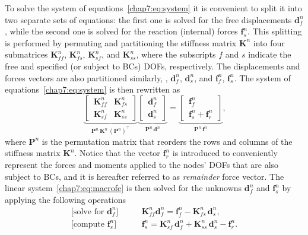 To solve the system of equations~\eqref{chap7:eq:system} it is convenient to split it into two separate sets of equations: the first one is solved for the free displacements $\mathbf{d}^{n}_{f}$, while the second one is solved for the reaction (internal) forces $\mathbf{f}^{n}_{s}$. This splitting is performed by permuting and partitioning the stiffness matrix $\mathbf{K}^{n}$ into four submatrices $\mathbf{K}^{n}_{ff}$, $\mathbf{K}^{n}_{fs}$, $\mathbf{K}^{n}_{sf}$, and $\mathbf{K}^{n}_{ss}$, where the subscripts $f$ and $s$ indicate the free and specified (or subject to \acp{BC}) \acp{DOF}, respectively. The displacements and forces vectors are also partitioned similarly, \eg{}, $\mathbf{d}^{n}_{f}$, $\mathbf{d}^{n}_{s}$, and $\mathbf{f}^{n}_{f}$, $\mathbf{f}^{n}_{s}$. The system of equations~\eqref{chap7:eq:system} is then rewritten as
%
\begin{equation}
    \label{chap7:eq:macrofe}
    \underbrace{\left[\,\begin{matrix}
      \mathbf{K}^{n}_{ff} & \mathbf{K}^{n}_{fs} \\[0.5em]
      \mathbf{K}^{n}_{sf} & \mathbf{K}^{n}_{ss}
    \end{matrix}\,\right]}_{\displaystyle \mathbf{P}^{n} \, \mathbf{K}^{n} \, (\mathbf{P}^{n})^\top} \underbrace{\left[\,\begin{matrix}
      \mathbf{d}^{n}_{f} \\[0.5em]
      \mathbf{d}^{n}_{s}
    \end{matrix}\,\right]}_{\displaystyle \mathbf{P}^{n} \, \mathbf{d}^{n}} = \underbrace{\left[\,\begin{matrix}
      \mathbf{f}^{n}_{f} \\[0.5em]
      \mathbf{f}^{n}_{s} + \mathbf{f}^{n}_{r}
    \end{matrix}\,\right]}_{\displaystyle \mathbf{P}^{n} \, \mathbf{f}^{n}} \text{,}
\end{equation}
%
where $\mathbf{P}^{n}$ is the permutation matrix that reorders the rows and columns of the stiffness matrix $\mathbf{K}^{n}$. Notice that the vector $\mathbf{f}^{n}_{r}$ is introduced to conveniently represent the forces and moments applied to the nodes' \acp{DOF} that are also subject to \acp{BC}, and it is hereafter referred to as \emph{remainder} force vector. The linear system~\eqref{chap7:eq:macrofe} is then solved for the unknowns $\mathbf{d}^{n}_{f}$ and $\mathbf{f}^{n}_{s}$ by applying the following operations
%
\begin{subequations}
  \label{chap7:eq:macrosol}
  \begin{align}
    \textrm{[solve for $\mathbf{d}^{n}_{f}$]} \qquad &\mathbf{K}^{n}_{ff}\mathbf{d}^{n}_{f} = \mathbf{f}^{n}_{f} - \mathbf{K}^{n}_{fs}\,\mathbf{d}^{n}_{s} \label{chap7:eq:macrodf} \text{,} \\
    \textrm{[compute $\mathbf{f}^{n}_{s}$]} \qquad &\mathbf{f}^{n}_{s} = \mathbf{K}^{n}_{sf}\,\mathbf{d}^{n}_{f} + \mathbf{K}^{n}_{ss}\,\mathbf{d}^{n}_{s} - \mathbf{f}^{n}_{r} \text{.} \label{chap7:eq:macrosolfs}
  \end{align}
\end{subequations}
